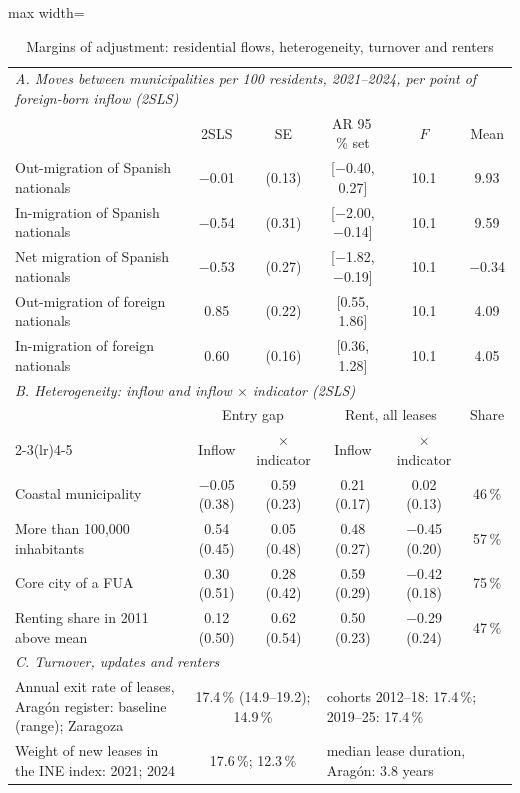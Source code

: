 \begin{table}[!htbp]\centering\small
\caption{Margins of adjustment: residential flows, heterogeneity, turnover and renters}\label{tab:margins}
\begin{adjustbox}{max width=\linewidth}\begin{tabular}{lccccc}\toprule
\multicolumn{6}{l}{\textit{A. Moves between municipalities per 100 residents, 2021--2024, per point of foreign-born inflow (2SLS)}}\\
 & 2SLS & SE & AR 95\,\% set & $F$ & Mean\\
Out-migration of Spanish nationals & $-$0.01 & (0.13) & [$-$0.40, 0.27] & 10.1 & 9.93\\
In-migration of Spanish nationals & $-$0.54 & (0.31) & [$-$2.00, $-$0.14] & 10.1 & 9.59\\
Net migration of Spanish nationals & $-$0.53 & (0.27) & [$-$1.82, $-$0.19] & 10.1 & $-$0.34\\
Out-migration of foreign nationals & 0.85 & (0.22) & [0.55, 1.86] & 10.1 & 4.09\\
In-migration of foreign nationals & 0.60 & (0.16) & [0.36, 1.28] & 10.1 & 4.05\\
\midrule
\multicolumn{6}{l}{\textit{B. Heterogeneity: inflow and inflow $\times$ indicator (2SLS)}}\\
 & \multicolumn{2}{c}{Entry gap} & \multicolumn{2}{c}{Rent, all leases} & Share\\\cmidrule(lr){2-3}\cmidrule(lr){4-5}
 & Inflow & $\times$ indicator & Inflow & $\times$ indicator & \\
Coastal municipality & $-$0.05 (0.38) & 0.59 (0.23) & 0.21 (0.17) & 0.02 (0.13) & 46\,\%\\
More than 100,000 inhabitants & 0.54 (0.45) & 0.05 (0.48) & 0.48 (0.27) & $-$0.45 (0.20) & 57\,\%\\
Core city of a FUA & 0.30 (0.51) & 0.28 (0.42) & 0.59 (0.29) & $-$0.42 (0.18) & 75\,\%\\
Renting share in 2011 above mean & 0.12 (0.50) & 0.62 (0.54) & 0.50 (0.23) & $-$0.29 (0.24) & 47\,\%\\
\midrule
\multicolumn{6}{l}{\textit{C. Turnover, updates and renters}}\\
Annual exit rate of leases, Aragón register: baseline (range); Zaragoza & \multicolumn{2}{c}{17.4\,\% (14.9--19.2); 14.9\,\%} & \multicolumn{3}{l}{cohorts 2012--18: 17.4\,\%; 2019--25: 17.4\,\%}\\
Weight of new leases in the INE index: 2021; 2024 & \multicolumn{2}{c}{17.6\,\%; 12.3\,\%} & \multicolumn{3}{l}{median lease duration, Aragón: 3.8 years}\\

\end{tabular}
\end{adjustbox}
\end{table}
